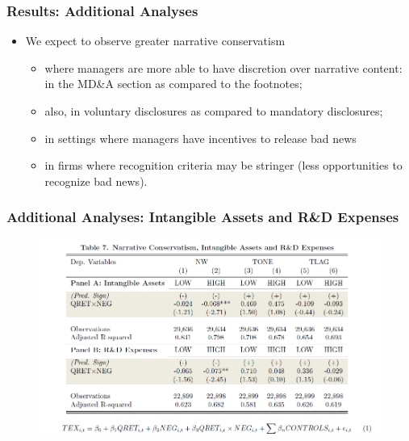 \documentclass{beamer}
\begin{document}
\begin{frame}
\frametitle{Results: Additional Analyses}
\begin{itemize}
	\item We expect to observe greater narrative conservatism
	\begin{itemize}
		\item where managers are more able to have discretion over narrative content: in the MD\&A section as compared to the footnotes;
		\item also, in voluntary disclosures as compared to mandatory disclosures;
		\item in settings where managers have incentives to release bad news
		\item in firms where recognition criteria may be stringer (less opportunities to recognize bad news).
	\end{itemize}
\end{itemize}
\end{frame}
\begin{frame}
	\frametitle{Additional Analyses: Intangible Assets and R\&D Expenses}
	\begin{figure}[h]
	\centering
	\includegraphics[width=0.9\linewidth]{tab7}
	\label{tab7}
	\end{figure}
	
\end{frame}
	
\end{document}
